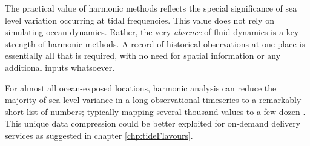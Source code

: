 The practical value of harmonic methods reflects the special significance of sea level variation occurring at tidal frequencies. This value does not rely on simulating ocean dynamics. Rather, the very \emph{absence} of fluid dynamics is a key strength of harmonic methods. 
A record of historical observations at one place is essentially all that is required, with no need for spatial information or any additional inputs whatsoever.

For almost all ocean-exposed locations, harmonic analysis can reduce the majority of sea level variance in a long observational timeseries to a remarkably short list of numbers; typically mapping several thousand values to a few dozen \citep{Flinchem:2000kp}.  This unique data compression could be better exploited for on-demand delivery services as suggested in chapter \ref{chp:tideFlavours}. 


